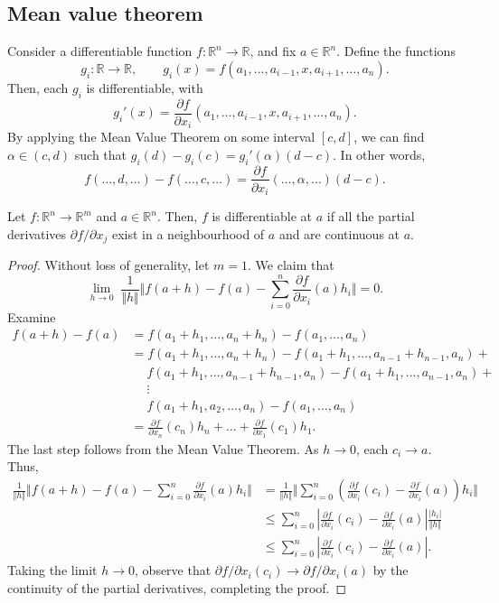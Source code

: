 \documentclass[11pt]{article}
\newcommand{\R}{\mathbb{R}}
\newcommand{\norm}[1]{\Vert #1 \Vert}
\newcommand{\pp}[2]{\frac{\partial #1}{\partial #2}}
\theoremstyle{definition}
\theoremstyle{remark}
\numberwithin{equation}{section}
\begin{document}
    \subsection{Mean value theorem}
    Consider a differentiable function $f\colon \R^n \to \R$, and fix $a \in \R^n$.
    Define the functions \[
        g_i\colon \R \to \R, \qquad g_i(x) = f(a_1, \dots, a_{i - 1}, x, a_{i + 1},
        \dots, a_n).
    \] Then, each $g_i$ is differentiable, with \[
        g_i'(x) = \pp{f}{x_i}(a_1, \dots, a_{i - 1}, x, a_{i + 1}, \dots, a_n).
    \] By applying the Mean Value Theorem on some interval $[c, d]$, we can find
    $\alpha \in (c, d)$ such that $g_i(d) - g_i(c) = g_i'(\alpha)(d - c)$. In other
    words,
    \[
        f(\dots, d, \dots) - f(\dots, c, \dots) = \pp{f}{x_i}(\dots, \alpha, \dots)(d
        - c).
    \] 

    \begin{theorem}
        Let $f\colon \R^n \to \R^m$ and $a \in \R^n$. Then, $f$ is differentiable at
        $a$ if all the partial derivatives $\partial f / \partial x_j$ exist in a
        neighbourhood of $a$ and are continuous at $a$.
    \end{theorem}
    \begin{proof}
        Without loss of generality, let $m = 1$. We claim that \[
            \lim_{h \to 0} \;\frac{1}{\norm{h}}\norm{f(a + h) - f(a) - \sum_{i = 0}^n
            \pp{f}{x_i}(a)h_i} = 0.
        \] Examine \begin{align*}
            f(a + h) - f(a) &= f(a_1 + h_1, \dots, a_n + h_n) - f(a_1, \dots, a_n) \\
            &= f(a_1 + h_1, \dots, a_n + h_n) - f(a_1 + h_1, \dots, a_{n - 1} + h_{n
            - 1}, a_n) + \\ 
            &\;\quad f(a_1 + h_1, \dots, a_{n - 1} + h_{n - 1}, a_n) - f(a_1 + h_1,
            \dots, a_{n - 1}, a_n) + \\
            &\;\quad \vdots \\
            &\;\quad f(a_1 + h_1, a_2, \dots, a_n) - f(a_1, \dots, a_n) \\
            &= \pp{f}{x_n}(c_n)h_n + \dots + \pp{f}{x_1}(c_1)h_1.
        \end{align*}
        The last step follows from the Mean Value Theorem. As $h \to 0$, each $c_i
        \to a$. Thus, \begin{align*}
            \frac{1}{\norm{h}}\norm{f(a + h) - f(a) - \sum_{i = 0}^n
            \pp{f}{x_i}(a)h_i} 
            &= \frac{1}{\norm{h}}\norm{\sum_{i = 0}^n \left(\pp{f}{x_i}(c_i) -
            \pp{f}{x_i}(a)\right)h_i} \\
            &\leq \sum_{i = 0}^n \left|\pp{f}{x_i}(c_i) - \pp{f}{x_i}(a)\right|
            \frac{|h_i|}{\norm{h}} \\
            &\leq \sum_{i = 0}^n \left|\pp{f}{x_i}(c_i) - \pp{f}{x_i}(a)\right|.
        \end{align*}
        Taking the limit $h \to 0$, observe that $\partial f / \partial x_i (c_i) \to
        \partial f / \partial x_i (a)$ by the continuity of the partial derivatives,
        completing the proof.
    \end{proof}
\end{document}
